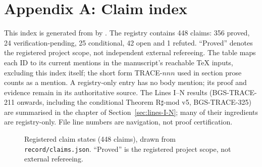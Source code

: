 \section*{Appendix A: Claim index}
This index is generated from  by
.
The registry contains 448 claims: 356 proved, 24 verification-pending,
25 conditional, 42 open and 1 refuted. ``Proved'' denotes the registered project scope,
not independent external refereeing. The table maps each ID to its current
mentions in the manuscript's reachable TeX inputs, excluding this index itself;
the short form TRACE-$nnn$ used in section prose counts as a mention.
A registry-only entry has no body mention; its proof and evidence remain in
its authoritative source. The Lines I--N results (BGS-TRACE-211 onwards,
including the conditional Theorem R$\sharp$-mod v5, BGS-TRACE-325) are summarised
in the chapter of Section~\ref{sec:lines-I-N}; many of their ingredients are
registry-only. File line numbers are navigation, not proof certification.
\begin{figure}[htbp]
\centering
{}
\caption{Registered claim states (448 claims), drawn from \texttt{record/claims.json}. ``Proved'' is the registered project scope, not external refereeing.}
\label{fig:registry-status}
\end{figure}
